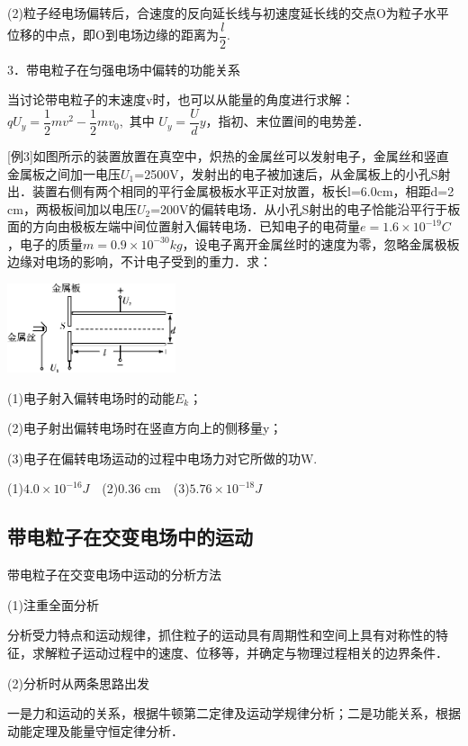 (2)粒子经电场偏转后，合速度的反向延长线与初速度延长线的交点O为粒子水平位移的中点，即O到电场边缘的距离为$\dfrac{l}{2}$.

3．带电粒子在匀强电场中偏转的功能关系

当讨论带电粒子的末速度v时，也可以从能量的角度进行求解：$q U_{y}=\dfrac{1}{2} m v^{2}-\dfrac{1}{2} m v_{0},$ 其中 $U_{y}=\dfrac{U}{d}y$，指初、末位置间的电势差．

{[}例3{]}如图所示的装置放置在真空中，炽热的金属丝可以发射电子，金属丝和竖直金属板之间加一电压$U_1$=2500V，发射出的电子被加速后，从金属板上的小孔S射出．装置右侧有两个相同的平行金属极板水平正对放置，板长l=6.0cm，相距d=2 cm，两极板间加以电压$U_2$=200V的偏转电场．从小孔S射出的电子恰能沿平行于板面的方向由极板左端中间位置射入偏转电场．已知电子的电荷量$e=1.6\times 10^{-19}C$，电子的质量$m=0.9\times 10^{-30}kg$，设电子离开金属丝时的速度为零，忽略金属极板边缘对电场的影响，不计电子受到的重力．求：

\begin{center}\includegraphics[width=1.94792in,height=1.03125in]{media/image300.png}\end{center}

(1)电子射入偏转电场时的动能$E_k$；

(2)电子射出偏转电场时在竖直方向上的侧移量y；

(3)电子在偏转电场运动的过程中电场力对它所做的功W.

\begin{solution}
	(1)$4.0\times 10^{-16} J$　(2)0.36 cm　(3)$5.76\times 10^{-18} J$
\end{solution}
\subsection{带电粒子在交变电场中的运动}

带电粒子在交变电场中运动的分析方法

(1)注重全面分析

分析受力特点和运动规律，抓住粒子的运动具有周期性和空间上具有对称性的特征，求解粒子运动过程中的速度、位移等，并确定与物理过程相关的边界条件．

(2)分析时从两条思路出发

一是力和运动的关系，根据牛顿第二定律及运动学规律分析；二是功能关系，根据动能定理及能量守恒定律分析．

